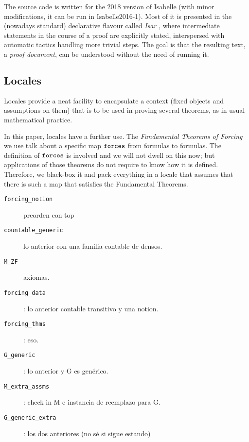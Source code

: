 \medskip
{}

\medskip

The source code is written for the 2018 version of Isabelle (with
minor modifications, it can be run in Isabelle2016-1). Most of it is
presented in the (nowadays standard) declarative flavour called
\emph{Isar} \cite{DBLP:conf/tphol/Wenzel99}, where intermediate
statements in the course 
of a proof are explicitly stated, interspersed with automatic 
tactics handling more trivial steps. The goal is that the resulting
text, a \emph{proof document}, can be understood without the need of
running it.

\subsection{Locales}
\label{sec:locales}
Locales \cite{ballarin2010tutorial} provide a neat facility to
encapsulate a context (fixed objects and assumptions on them) that is
to be used in proving several theorems, as in usual mathematical
practice. 

In this paper, locales have a further use. The \emph{Fundamental
  Theorems of Forcing} we use talk about a specific map $\mathop{\mathtt{forces}}$
from formulas to formulas. The definition of $\mathop{\mathtt{forces}}$ is involved
and we will not dwell on this now; but applications of those theorems
do not require to know how it is defined. Therefore, we black-box it
and pack everything in a locale that assumes that there is such a
map that satisfies the Fundamental Theorems.

\begin{description}
\item[\texttt{forcing\_notion}] preorden con top
\item[\texttt{countable\_generic}] lo anterior con una familia contable de densos.
\item[\texttt{M\_ZF}] axiomas.
\item[\texttt{forcing\_data}]: lo anterior contable transitivo y una notion.
\item[\texttt{forcing\_thms}]: eso.
\item[\texttt{G\_generic}]: lo anterior y G es genérico.
\item[\texttt{M\_extra\_assms}]: check in M e instancia de reemplazo para G.
\item[\texttt{G\_generic\_extra}]: los dos anteriores (no sé si sigue estando)
\end{description}


